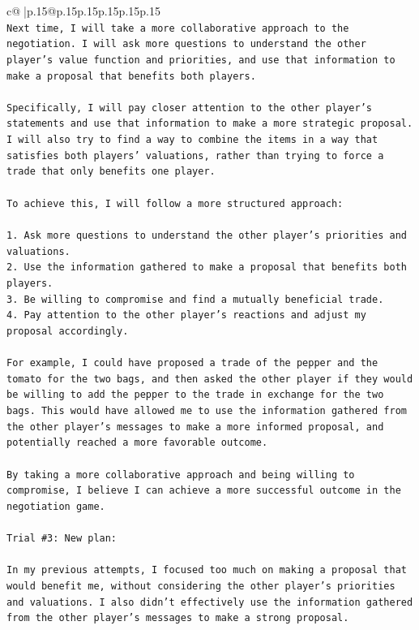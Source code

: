 \documentclass{article}
\begin{document}
{\begin{supertabular}{c@{$\;$}|p{.15\linewidth}@{}p{.15\linewidth}p{.15\linewidth}p{.15\linewidth}p{.15\linewidth}p{.15\linewidth}}
{{{\\ 
\texttt{Next time, I will take a more collaborative approach to the negotiation. I will ask more questions to understand the other player's value function and priorities, and use that information to make a proposal that benefits both players.} \\
\\ 
\texttt{Specifically, I will pay closer attention to the other player's statements and use that information to make a more strategic proposal. I will also try to find a way to combine the items in a way that satisfies both players' valuations, rather than trying to force a trade that only benefits one player.} \\
\\ 
\texttt{To achieve this, I will follow a more structured approach:} \\
\\ 
\texttt{1. Ask more questions to understand the other player's priorities and valuations.} \\
\texttt{2. Use the information gathered to make a proposal that benefits both players.} \\
\texttt{3. Be willing to compromise and find a mutually beneficial trade.} \\
\texttt{4. Pay attention to the other player's reactions and adjust my proposal accordingly.} \\
\\ 
\texttt{For example, I could have proposed a trade of the pepper and the tomato for the two bags, and then asked the other player if they would be willing to add the pepper to the trade in exchange for the two bags. This would have allowed me to use the information gathered from the other player's messages to make a more informed proposal, and potentially reached a more favorable outcome.} \\
\\ 
\texttt{By taking a more collaborative approach and being willing to compromise, I believe I can achieve a more successful outcome in the negotiation game.} \\
\\ 
\texttt{Trial \#3: New plan: } \\
\\ 
\texttt{In my previous attempts, I focused too much on making a proposal that would benefit me, without considering the other player's priorities and valuations. I also didn't effectively use the information gathered from the other player's messages to make a strong proposal.} \\
}}}
\end{supertabular}}
\end{document}
